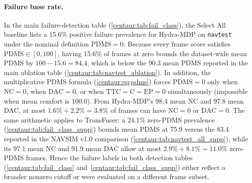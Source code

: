 \paragraph{Failure base rate.} In the main failure-detection table (\ref{centaur:tab:fail_class}), the Select All baseline lists a 15.6\% positive failure prevalence for Hydra-MDP on \texttt{navtest} under the nominal definition $\mathrm{PDMS}=0$. Because every frame score satisfies $\mathrm{PDMS} \in [0, 100]$, having 15.6\% of frames at zero bounds the dataset-wide mean PDMS by $100 - 15.6 = 84.4$, which is below the 90.3 mean PDMS reported in the main ablation table (\ref{centaur:tab:navtest_ablation}). In addition, the multiplicative PDMS formula (\ref{centaur:eq:pdms}) forces $\mathrm{PDMS}=0$ only when $\mathrm{NC}=0$, when $\mathrm{DAC}=0$, or when $\mathrm{TTC}=\mathrm{C}=\mathrm{EP}=0$ simultaneously (impossible when mean comfort is 100.0). From Hydra-MDP's 98.4 mean NC and 97.8 mean DAC, at most $1.6\% + 2.2\% = 3.8\%$ of frames can have $\mathrm{NC}=0$ or $\mathrm{DAC}=0$. The same arithmetic applies to TransFuser: a 24.1\% zero-PDMS prevalence (\ref{centaur:tab:fail_class_supp}) bounds mean PDMS at 75.9 versus the 83.4 reported in the NAVSIM v1.0 comparison (\ref{centaur:tab:navtest_all_supp}), while its 97.1 mean NC and 91.9 mean DAC allow at most $2.9\% + 8.1\% = 11.0\%$ zero-PDMS frames. Hence the failure labels in both detection tables (\ref{centaur:tab:fail_class} and~\ref{centaur:tab:fail_class_supp}) either reflect a broader nonzero cutoff or were evaluated on a different frame subset.

